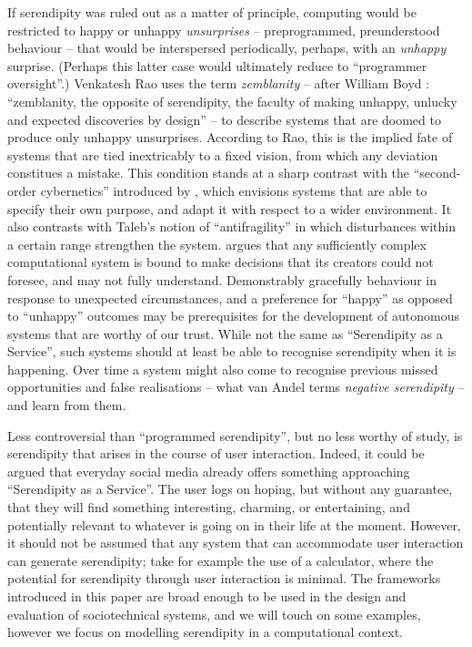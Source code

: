 If serendipity was ruled out as a matter of principle, computing would
be restricted to happy or unhappy \emph{unsurprises} -- preprogrammed,
preunderstood behaviour -- that would be interspersed periodically,
perhaps, with an \emph{unhappy} surprise.  (Perhaps this latter case
would ultimately reduce to ``programmer oversight''.)  Venkatesh Rao
\citeyearpar{rao2015breaking} uses the term \emph{zemblanity} -- after
William Boyd \citeyearpar{boyd2010armadillo}: ``zemblanity, the
opposite of serendipity, the faculty of making unhappy, unlucky and
expected discoveries by design'' -- to describe systems that are
doomed to produce only unhappy unsurprises.  According to Rao, this is
the implied fate of systems that are tied inextricably to a fixed
vision, from which any deviation constitues a mistake.  This condition
stands at a sharp contrast with the ``second-order cybernetics''
introduced by , which envisions systems that
are able to specify their own purpose, and adapt it with respect to a
wider environment.  It also contrasts with Taleb's
\citeyearpar{taleb2012antifragile} notion of ``antifragility'' in
which disturbances within a certain range strengthen the system.
 argues that any sufficiently complex
computational system is bound to make decisions that its creators
could not foresee, and may not fully understand.  Demonstrably
gracefully behaviour in response to unexpected circumstances, and a
preference for ``happy'' as opposed to ``unhappy'' outcomes may be
prerequisites for the development of autonomous systems that are
worthy of our trust.  While not the same as ``Serendipity as a
Service'', such systems should at least be able to recognise
serendipity when it is happening.  Over time a system might also come
to recognise previous missed opportunities and false realisations --
what van Andel \citeyearpar[p.~639]{van1994anatomy} terms \emph{negative
  serendipity} -- and learn from them.

Less controversial than ``programmed serendipity'', but no less worthy
of study, is serendipity that arises in the course of user
interaction.  Indeed, it could be argued that everyday social media
already offers something approaching ``Serendipity as a Service''.
The user logs on hoping, but without any guarantee, that they will
find something interesting, charming, or entertaining, and potentially
relevant to whatever is going on in their life at the moment.
However, it should not be assumed that any system that can accommodate
user interaction can generate serendipity; take for example the use of
a calculator, where the potential for serendipity through user
interaction is minimal.  The frameworks introduced in this paper are
broad enough to be used in the design and evaluation of sociotechnical
systems, and we will touch on some examples, however we focus on
modelling serendipity in a computational context.

